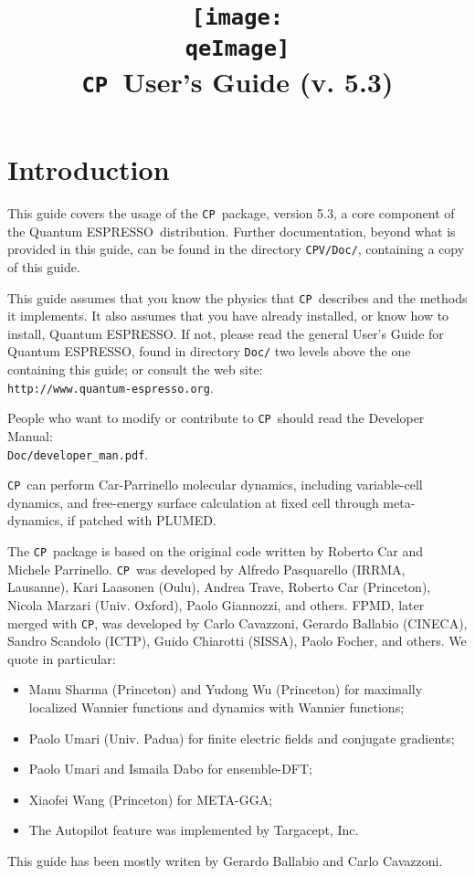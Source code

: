 \documentclass[12pt,a4paper]{article}
\def\version{5.3}
\def\qe{{\sc Quantum ESPRESSO}}
\def\CP{\texttt{CP}}
\begin{document}
 
\author{}
\date{}

\def\qeImage{../../Doc/quantum_espresso.pdf}

\title{
  \texttt{[image: \\qeImage]} \\
  \Huge \CP\ User's Guide (v. \version)
}

\maketitle

\tableofcontents

\section{Introduction}

This guide covers the  usage of the
\CP\ package, version \version, a core component 
of the \qe\ distribution.
Further documentation, beyond what is provided 
in this guide, can be found in the directory
\texttt{CPV/Doc/}, containing a copy of this guide.

This guide assumes that you know the physics 
that \CP\ describes and the methods it implements.
It also assumes  that you have already installed,
or know how to install, \qe. If not, please read
the general User's Guide for \qe, found in 
directory \texttt{Doc/} two levels above the 
one containing this guide; or consult the web site:\\
\texttt{http://www.quantum-espresso.org}.

People who want to modify or contribute to 
\CP\ should read the Developer Manual: \\
\texttt{Doc/developer\_man.pdf}.

\CP\ can perform Car-Parrinello molecular dynamics, including
variable-cell dynamics, and free-energy surface calculation at
fixed cell through meta-dynamics, if patched with PLUMED.

The \CP\ package is based on the original code written by
 Roberto Car
and Michele Parrinello. \CP\ was developed by Alfredo Pasquarello
(IRRMA, Lausanne), Kari Laasonen (Oulu), Andrea Trave, Roberto
Car (Princeton), Nicola Marzari (Univ. Oxford), Paolo Giannozzi, and others.
FPMD, later merged with \CP, was developed by Carlo
Cavazzoni, 
Gerardo Ballabio (CINECA), Sandro Scandolo (ICTP), 
Guido Chiarotti (SISSA), Paolo Focher, and others.
We quote in particular:
\begin{itemize}
  \item Manu Sharma (Princeton) and Yudong Wu (Princeton) for
   maximally localized Wannier functions and dynamics with 
   Wannier functions;
  \item Paolo Umari (Univ. Padua) for finite electric fields and conjugate
   gradients;
  \item Paolo Umari and Ismaila Dabo for ensemble-DFT;
  \item Xiaofei Wang (Princeton) for META-GGA;
  \item The Autopilot feature was implemented by Targacept, Inc.
\end{itemize}
This guide has been mostly writen by Gerardo Ballabio and Carlo Cavazzoni.
\end{document}
